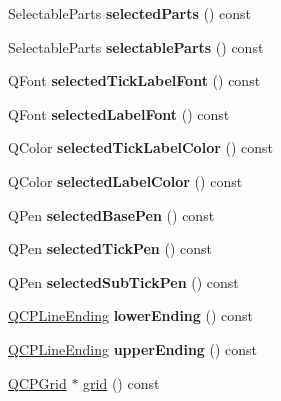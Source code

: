 \begin{DoxyCompactItemize}
Selectable\+Parts {\bfseries selected\+Parts} () const
\item 
\mbox{\label{class_q_c_p_axis_a1d12d157756c114f4e57517c62177181}} 
Selectable\+Parts {\bfseries selectable\+Parts} () const
\item 
\mbox{\label{class_q_c_p_axis_a09817512bef8ddfb669a6828f9c855bc}} 
Q\+Font {\bfseries selected\+Tick\+Label\+Font} () const
\item 
\mbox{\label{class_q_c_p_axis_a1399d614f7c307159bfec938a069203d}} 
Q\+Font {\bfseries selected\+Label\+Font} () const
\item 
\mbox{\label{class_q_c_p_axis_a75f11d3031a11559f3e984e916fcde2c}} 
Q\+Color {\bfseries selected\+Tick\+Label\+Color} () const
\item 
\mbox{\label{class_q_c_p_axis_a7adea64ef4b715e7a1c519fff2b110b8}} 
Q\+Color {\bfseries selected\+Label\+Color} () const
\item 
\mbox{\label{class_q_c_p_axis_a0d54314ab3053fd0fb77294a0e7f08cb}} 
Q\+Pen {\bfseries selected\+Base\+Pen} () const
\item 
\mbox{\label{class_q_c_p_axis_a76b52a6d824ccf9a95eb024251e1b833}} 
Q\+Pen {\bfseries selected\+Tick\+Pen} () const
\item 
\mbox{\label{class_q_c_p_axis_a73c147bb2c5598edbb842adc2da8a7bf}} 
Q\+Pen {\bfseries selected\+Sub\+Tick\+Pen} () const
\item 
\mbox{\label{class_q_c_p_axis_a0cc60e5694ed4df6a2c3554e53ee6ae7}} 
\hyperlink{class_q_c_p_line_ending}{Q\+C\+P\+Line\+Ending} {\bfseries lower\+Ending} () const
\item 
\mbox{\label{class_q_c_p_axis_a9feaf5f78286693e89221bc205f9389a}} 
\hyperlink{class_q_c_p_line_ending}{Q\+C\+P\+Line\+Ending} {\bfseries upper\+Ending} () const
\item 
\hyperlink{class_q_c_p_grid}{Q\+C\+P\+Grid} $\ast$ \hyperlink{class_q_c_p_axis_a63f1dd2df663680d2a8d06c19592dd63}{grid} () const

\end{DoxyCompactItemize}
